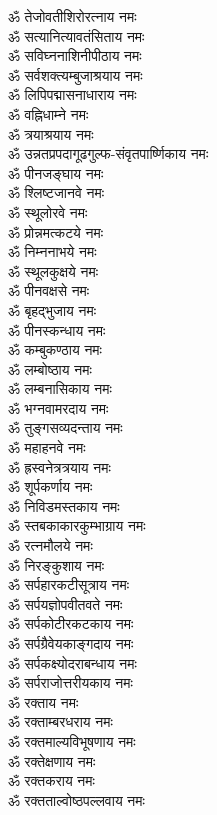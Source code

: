\begin{multicols}{2}
\begin{flushleft}
ॐ तेजोवतीशिरोरत्नाय नमः\\
ॐ सत्यानित्यावतंसिताय नमः\hfill{}\\
ॐ सविघ्ननाशिनीपीठाय नमः\\
ॐ सर्वशक्त्यम्बुजाश्रयाय नमः\\
ॐ लिपिपद्मासनाधाराय नमः\\
ॐ वह्निधाम्ने नमः\\
ॐ त्रयाश्रयाय नमः\\
ॐ उन्नतप्रपदागूढगुल्फ-संवृतपार्ष्णिकाय नमः\\
ॐ पीनजङ्घाय नमः\\
ॐ श्लिष्टजानवे नमः\\
ॐ स्थूलोरवे नमः\\
ॐ प्रोन्नमत्कटये नमः\hfill{}\\
ॐ निम्ननाभये नमः\\
ॐ स्थूलकुक्षये नमः\\
ॐ पीनवक्षसे नमः\\
ॐ बृहद्भुजाय नमः\\
ॐ पीनस्कन्धाय नमः\\
ॐ कम्बुकण्ठाय नमः\\
ॐ लम्बोष्ठाय नमः\\
ॐ लम्बनासिकाय नमः\\
ॐ भग्नवामरदाय नमः\\
ॐ तुङ्गसव्यदन्ताय नमः\hfill{}\\
ॐ महाहनवे नमः\\
ॐ ह्रस्वनेत्रत्रयाय नमः\\
ॐ शूर्पकर्णाय नमः\\
ॐ निविडमस्तकाय नमः\\
ॐ स्तबकाकारकुम्भाग्राय नमः\\
ॐ रत्नमौलये नमः\\
ॐ निरङ्कुशाय नमः\\
ॐ सर्पहारकटीसूत्राय नमः\\
ॐ सर्पयज्ञोपवीतवते नमः\\
ॐ सर्पकोटीरकटकाय नमः\hfill{}\\
ॐ सर्पग्रैवेयकाङ्गदाय नमः\\
ॐ सर्पकक्ष्योदराबन्धाय नमः\\
ॐ सर्पराजोत्तरीयकाय नमः\\
ॐ रक्ताय नमः\\
ॐ रक्ताम्बरधराय नमः\\
ॐ रक्तमाल्यविभूषणाय नमः\\
ॐ रक्तेक्षणाय नमः\\
ॐ रक्तकराय नमः\\
ॐ रक्तताल्वोष्ठपल्लवाय नमः\\

\end{flushleft}
\end{multicols}
